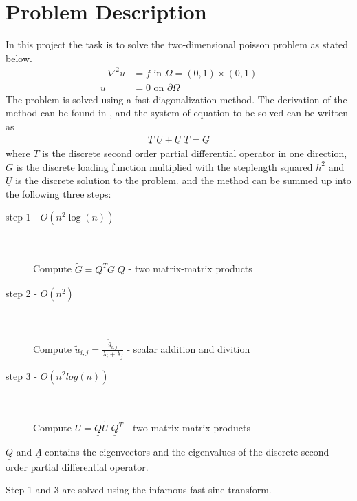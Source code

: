 \section{Problem Description}

In this project the task is to solve the two-dimensional poisson problem as stated below.
\begin{align}
	-\nabla^2 u &= f  \text{ in } \Omega = (0,1)\times(0,1) \\
	u &=  0 \text{ on } \partial \Omega
\end{align}
%
The problem is solved using a fast diagonalization method. The derivation of the method can be found in \cite{poisson} ,
and the system of equation to be solved can be written as 
\begin{align}
	\underline{T} \; \underline{U} + 	\underline{U} \; \underline{T} = \underline{G} 	
	\label{eq:Matrix}
\end{align}
where $\underline{T}$ is the discrete second order partial differential operator in one direction, 
$\underline{G}$ is the discrete loading function multiplied with the steplength squared $h^2$ and $\underline{U}$ is the discrete solution
to the problem.
and the method can be summed up into the following three steps:


\begin{description}
	\item[step 1  -  $O(n^2\log(n))$] \hfill \\ \hfill \\
		Compute $\underline{\tilde{G}} = \underline{Q}^T\underline{G} \; \underline{Q} $    -    two matrix-matrix products 
		\hfill \\
   \item[step 2  -  $O(n^2)$] \hfill \\ \hfill \\ 
		Compute $\tilde{u}_{i,j} = \frac{\tilde{g}_{i,j}}{\lambda_i+\lambda_j}$    -    scalar addition and divition
		\hfill \\
	\item[step 3  -  $O(n^2log(n))$] \hfill \\ \hfill \\
		Compute $\underline{U} = \underline{Q}\underline{\tilde{U}} \; \underline{Q}^T $    -     two matrix-matrix products 
\end{description}

$\underline{Q}$ and $\underline{\Lambda}$ contains the eigenvectors and the eigenvalues of the discrete 
second order partial differential operator. 

Step 1 and 3 are solved using the infamous fast sine transform.
